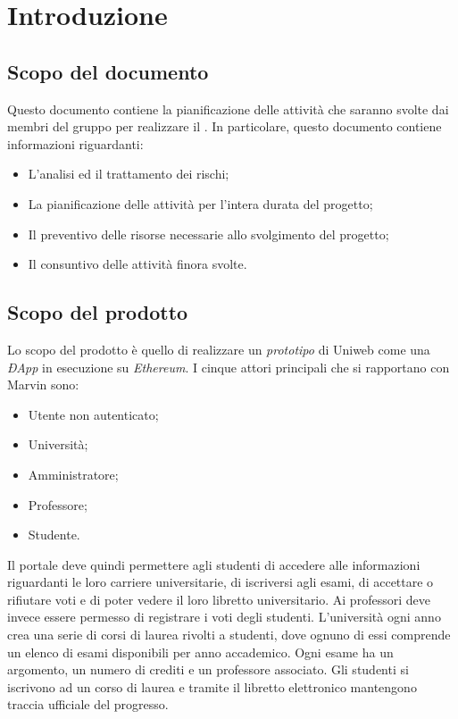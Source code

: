 \newpage
\section{Introduzione}
\subsection{Scopo del documento}
Questo documento contiene la pianificazione delle attività che saranno svolte dai membri del gruppo \Gruppo{} per realizzare il \NomeProgetto. In particolare, questo documento contiene informazioni riguardanti:

\begin{itemize}
	\item L'analisi ed il trattamento dei rischi;
	\item La pianificazione delle attività per l'intera durata del progetto;
	\item Il preventivo delle risorse necessarie allo svolgimento del progetto;
	\item Il consuntivo delle attività finora svolte.
\end{itemize}

\subsection{Scopo del prodotto}
Lo scopo del prodotto è quello di realizzare un \emph{prototipo} di Uniweb come una \emph{ÐApp} in esecuzione su \emph{Ethereum}. I cinque attori principali che si rapportano con Marvin sono:
\begin{itemize}
	\item Utente non autenticato; 
	\item Università;
	\item Amministratore;
	\item Professore;
	\item Studente.
\end{itemize} 
Il portale deve quindi permettere agli studenti di accedere alle informazioni riguardanti le loro carriere universitarie, di iscriversi agli esami, di accettare o rifiutare voti e di poter vedere il loro libretto universitario.
Ai professori deve invece essere permesso di registrare i voti degli studenti.
L'università ogni anno crea una serie di corsi di laurea rivolti a studenti, dove ognuno di essi comprende un elenco di esami disponibili per anno accademico. Ogni esame ha un argomento, un numero di crediti e un professore associato. Gli studenti si iscrivono ad un corso di laurea e tramite il libretto elettronico mantengono traccia ufficiale del progresso.

